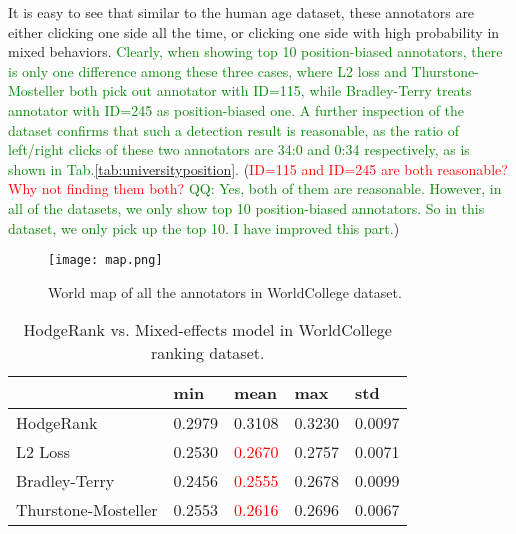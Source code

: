 \documentclass[10pt,journal,cspaper,compsoc]{IEEEtran}
\begin{document}
{It is easy to see that similar to the human age dataset, these annotators are either clicking one
side all the time, or clicking one side with high probability in mixed behaviors. \textcolor{green}{Clearly, when showing top 10 position-biased annotators, there is only one difference among these three cases, where L2 loss and Thurstone-Mosteller both pick out annotator with ID=115, while Bradley-Terry treats annotator with ID=245 as position-biased one.
A further inspection of the dataset
confirms that such a detection result is reasonable, as the ratio of left/right clicks of these two annotators are 34:0 and 0:34 respectively, as is shown in Tab.\ref{tab:universityposition}. } (\textcolor{red}{ID=115 and ID=245 are both reasonable? Why not finding them both?} \textcolor{green}{QQ: Yes, both of them are reasonable. However, in all of the datasets, we only show top 10 position-biased annotators. So in this dataset, we only pick up the top 10. I have improved this part.})

\begin{figure}[h]
 \begin{center}
\texttt{[image: map.png]}
  \caption{World map of all the annotators in WorldCollege dataset.} \label{map}
\end{center}
\end{figure}

\begin{table}[h]\caption{\label{tab:university} HodgeRank vs. Mixed-effects model in WorldCollege ranking dataset.}
\centering
\begin{tabular}{lllll}
 \hline     &min  &mean &max &std\\
 \hline  HodgeRank     &0.2979    &0.3108    &0.3230    &0.0097  \\
\hline  L2 Loss      &0.2530    &\textcolor{red}{0.2670}    &0.2757    &0.0071  \\
\hline Bradley-Terry     &0.2456    &\textcolor{red}{0.2555}    &0.2678    &0.0099 \\
\hline Thurstone-Mosteller      &0.2553    &\textcolor{red}{0.2616}    &0.2696    &0.0067  \\
 \hline
 \end {tabular}
\end{table}




}
\end{document}
